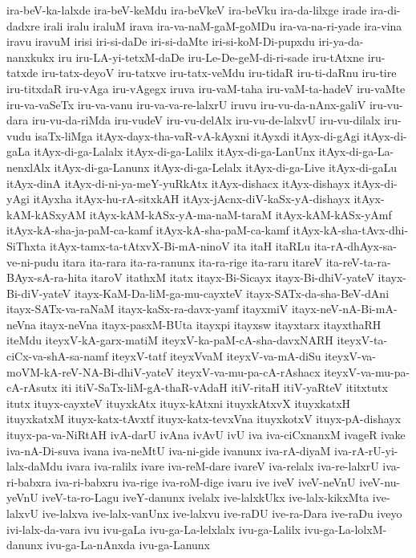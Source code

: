 {ira-beV-ka-lalxde
ira-beV-keMdu
ira-beVkeV
ira-beVku
ira-da-lilxge
irade
ira-di-dadxre
irali
iralu
iraluM
irava
ira-va-naM-gaM-goMDu
ira-va-na-ri-yade
ira-vina
iravu
iravuM
irisi
iri-si-daDe
iri-si-daMte
iri-si-koM-Di-pupxdu
iri-ya-da-nanxkukx
iru
iru-LA-yi-tetxM-daDe
iru-Le-De-geM-di-ri-sade
iru-tAtxne
iru-tatxde
iru-tatx-deyoV
iru-tatxve
iru-tatx-veMdu
iru-tidaR
iru-ti-daRnu
iru-tire
iru-titxdaR
iru-vAga
iru-vAgegx
iruva
iru-vaM-taha
iru-vaM-ta-hadeV
iru-vaMte
iru-va-vaSeTx
iru-va-vanu
iru-va-va-re-lalxrU
iruvu
iru-vu-da-nAnx-galiV
iru-vu-dara
iru-vu-da-riMda
iru-vudeV
iru-vu-delAlx
iru-vu-de-lalxvU
iru-vu-dilalx
iru-vudu
isaTx-liMga
itAyx-dayx-tha-vaR-vA-kAyxni
itAyxdi
itAyx-di-gAgi
itAyx-di-gaLa
itAyx-di-ga-Lalalx
itAyx-di-ga-Lalilx
itAyx-di-ga-LanUnx
itAyx-di-ga-La-nenxlAlx
itAyx-di-ga-Lanunx
itAyx-di-ga-Lelalx
itAyx-di-ga-Live
itAyx-di-gaLu
itAyx-dinA
itAyx-di-ni-ya-meY-yuRkAtx
itAyx-dishacx
itAyx-dishayx
itAyx-di-yAgi
itAyxha
itAyx-hu-rA-sitxkAH
itAyx-jAcnx-diV-kaSx-yA-dishayx
itAyx-kAM-kASxyAM
itAyx-kAM-kASx-yA-ma-naM-taraM
itAyx-kAM-kASx-yAmf
itAyx-kA-sha-ja-paM-ca-kamf
itAyx-kA-sha-paM-ca-kamf
itAyx-kA-sha-tAvx-dhi-SiThxta
itAyx-tamx-ta-tAtxvX-Bi-mA-ninoV
ita
itaH
itaRLu
ita-rA-dhAyx-sa-ve-ni-pudu
itara
ita-rara
ita-ra-ranunx
ita-ra-rige
ita-raru
itareV
ita-reV-ta-ra-BAyx-sA-ra-hita
itaroV
itathxM
itatx
itayx-Bi-Sicayx
itayx-Bi-dhiV-yateV
itayx-Bi-diV-yateV
itayx-KaM-Da-liM-ga-mu-cayxteV
itayx-SATx-da-sha-BeV-dAni
itayx-SATx-va-raNaM
itayx-kaSx-ra-davx-yamf
itayxmiV
itayx-neV-nA-Bi-mA-neVna
itayx-neVna
itayx-pasxM-BUta
itayxpi
itayxsw
itayxtarx
itayxthaRH
iteMdu
iteyxV-kA-garx-matiM
iteyxV-ka-paM-cA-sha-davxNARH
iteyxV-ta-ciCx-va-shA-sa-namf
iteyxV-tatf
iteyxVvaM
iteyxV-va-mA-diSu
iteyxV-va-moVM-kA-reV-NA-Bi-dhiV-yateV
iteyxV-va-mu-pa-cA-rAshacx
iteyxV-va-mu-pa-cA-rAsutx
iti
itiV-SaTx-liM-gA-thaR-vAdaH
itiV-ritaH
itiV-yaRteV
ititxtutx
itutx
ituyx-cayxteV
ituyxkAtx
ituyx-kAtxni
ituyxkAtxvX
ituyxkatxH
ituyxkatxM
ituyx-katx-tAvxtf
ituyx-katx-tevxVna
ituyxkotxV
ituyx-pA-dishayx
ituyx-pa-va-NiRtAH
ivA-darU
ivAna
ivAvU
ivU
iva
iva-ciCxnanxM
ivageR
ivake
iva-nA-Di-suva
ivana
iva-neMtU
iva-ni-gide
ivanunx
iva-rA-diyaM
iva-rA-rU-yi-lalx-daMdu
ivara
iva-ralilx
ivare
iva-reM-dare
ivareV
iva-relalx
iva-re-lalxrU
iva-ri-babxra
iva-ri-babxru
iva-rige
iva-roM-dige
ivaru
ive
iveV
iveV-neVnU
iveV-nu-yeVnU
iveV-ta-ro-Lagu
iveY-danunx
ivelalx
ive-lalxkUkx
ive-lalx-kikxMta
ive-lalxvU
ive-lalxva
ive-lalx-vanUnx
ive-lalxvu
ive-raDU
ive-ra-Dara
ive-raDu
iveyo
ivi-lalx-da-vara
ivu
ivu-gaLa
ivu-ga-La-lelxlalx
ivu-ga-Lalilx
ivu-ga-La-lolxM-danunx
ivu-ga-La-nAnxda
ivu-ga-Lanunx
}
